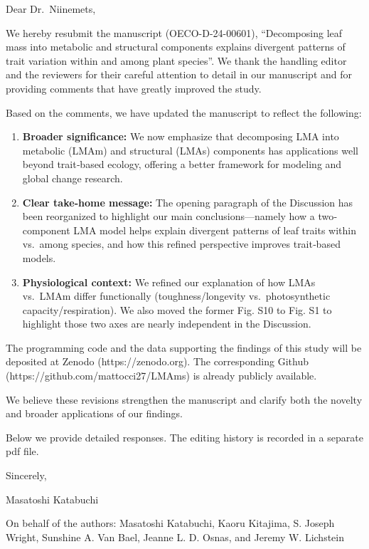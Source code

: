 \documentclass[
  12pt,
  letterpaper,
  DIV=11,
  numbers=noendperiod]{scrartcl}
\author{Masatoshi Katabuchi}
\date{2025-01-28}
\begin{document}
Dear Dr.~Niinemets,

We hereby resubmit the manuscript (OECO-D-24-00601), ``Decomposing leaf
mass into metabolic and structural components explains divergent
patterns of trait variation within and among plant species''. We thank
the handling editor and the reviewers for their careful attention to
detail in our manuscript and for providing comments that have greatly
improved the study.

Based on the comments, we have updated the manuscript to reflect the
following:

\begin{enumerate}
\def\labelenumi{\arabic{enumi}.}
\item
  \textbf{Broader significance:} We now emphasize that decomposing LMA
  into metabolic (LMAm) and structural (LMAs) components has
  applications well beyond trait‐based ecology, offering a better
  framework for modeling and global change research.
\item
  \textbf{Clear take‐home message:} The opening paragraph of the
  Discussion has been reorganized to highlight our main
  conclusions---namely how a two‐component LMA model helps explain
  divergent patterns of leaf traits within vs.~among species, and how
  this refined perspective improves trait‐based models.
\item
  \textbf{Physiological context:} We refined our explanation of how LMAs
  vs.~LMAm differ functionally (toughness/longevity vs.~photosynthetic
  capacity/respiration). We also moved the former Fig. S10 to Fig. S1 to
  highlight those two axes are nearly independent in the Discussion.
\end{enumerate}

The programming code and the data supporting the findings of this study
will be deposited at Zenodo (https://zenodo.org). The corresponding
Github (https://github.com/mattocci27/LMAms) is already publicly
available.

We believe these revisions strengthen the manuscript and clarify both
the novelty and broader applications of our findings.

Below we provide detailed responses. The editing history is recorded in
a separate pdf file.

Sincerely,

Masatoshi Katabuchi

On behalf of the authors: Masatoshi Katabuchi, Kaoru Kitajima, S. Joseph
Wright, Sunshine A. Van Bael, Jeanne L. D. Osnas, and Jeremy W.
Lichstein
\end{document}
